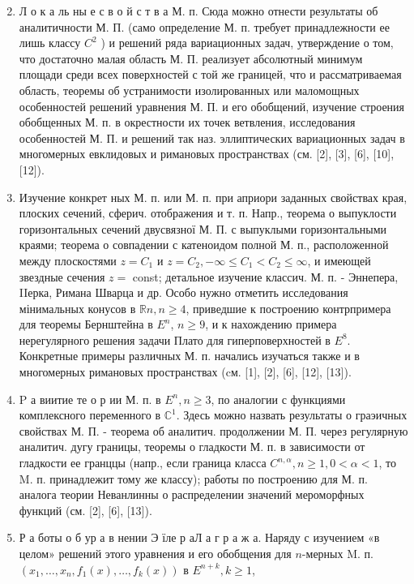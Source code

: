 \documentclass[10pt]{article}
\begin{document}
\begin{enumerate}

  \setcounter{enumi}{1}

  \item Л о к а ль ны е с в о й с т в а М. п. Сюда можно отнести результаты об аналитичности М. П. (само определение М. п. требует принадлежности ее лишь классу $C^{2}$ ) и решений ряда вариационных задач, утверждение о том, что достаточно малая область М. П. реализует абсолютный минимум площади среди всех поверхностей с той же границей, что и рассматриваемая область, теоремы об устранимости изолированных или маломощных особенностей решений уравнения М. П. и его обобщений, изучение строения обобщенных М. п. в окрестности их точек ветвления, исследования особенностей М. П. и решений так наз. эллиптических вариационных задач в многомерных евклидовых и римановых пространствах (см. [2], [3], [6], [10], [12]).



  \item Изучение конкрет ных М. п. или М. п. при априори заданных свойствах края, плоских сечений, сферич. отображения и т. п. Напр., теорема о выпуклости горизонтальных сечений двусвязної М. П. с выпуклыми горизонтальными краями; теорема о совпадении с катеноидом полной М. п., расположенной между плоскостями $z=C_{1}$ и $z=C_{2},-\infty \leqslant C_{1}<C_{2} \leqslant \infty$, и имеющей звездные сечения $z=$ const; детальное изучение классич. М. п. - Эннепера, IIерка, Римана Шварца и др. Особо нужно отметить исследования мінимальных конусов в $\mathbb{R} n, n \geqslant 4$, приведшие к построению контрпримера для теоремы Бернштейна в $E^{n}$, $n \geqslant 9$, и к нахождению примера нерегулярного решения задачи Плато для гиперповерхностей в $E^{8}$. Конкретные примеры различных М. п. начались изучаться также и в многомерных римановых пространствах (cм. [1], [2], [6], [12], [13]).



  \item $\mathrm{P}$ а виитие те о р ии М. п. в $E^{n}, n \geqslant 3$, по аналогии с функциями комплексного переменного в $\mathbb{C}^{1}$. Здесь можно назвать результаты о граэичных свойствах М. П. - теорема об аналитич. продолжении М. П. через регулярную аналитич. дугу границы, теоремы о гладкости М. п. в зависимости от гладкости ее гранццы (напр., если граница класса $C^{n, \alpha}, n \geqslant 1,0<\alpha<1$, то M. п. принадлежит тому же классу); работы по построению для М. п. аналога теории Неванлинны о распределении значений мероморфных функций (см. [2], [6], [13]).



  \item Р а боты о б ур а в нении Э їле р аЛ а г р а ж а. Наряду с изучением «в целом» решений этого уравнения и его обобщения для $n$-мерных M. п. $\left(x_{1}, \ldots, x_{n}, f_{1}(x), \ldots, f_{k}(x)\right)$ в $E^{n+k}, k \geqslant 1$,



\end{enumerate}
\end{document}
